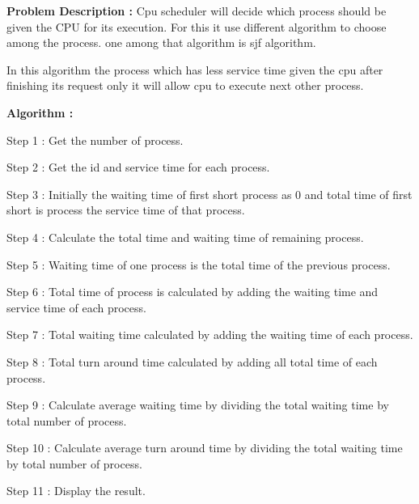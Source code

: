 \documentclass[journal,onecolumn]{IEEEtran}
\begin{document}
\textbf{Problem Description : }
Cpu scheduler will decide which process should be given the CPU for its execution. For this it use different algorithm to choose among the process. one among that algorithm is sjf algorithm.

In this algorithm the process which has less service time given the cpu after finishing its request only it will allow cpu to execute next other process.

\textbf{Algorithm : }
\begin{list}{}{}
  \item Step 1 : Get the number of process.
  \item Step 2 : Get the id and service time for each process.
  \item Step 3 : Initially the waiting time of first short process as 0 and total time of
        first short is process the service time of that process.
  \item Step 4 : Calculate the total time and waiting time of remaining process.
  \item Step 5 : Waiting time of one process is the total time of the previous process.
  \item Step 6 : Total time of process is calculated by adding the waiting time and
        service time of each process.
  \item Step 7 : Total waiting time calculated by adding the waiting time of each
        process.
  \item Step 8 : Total turn around time calculated by adding all total time of
        each process.
  \item Step 9 : Calculate average waiting time by dividing the total waiting time by
        total number of process.
  \item Step 10 : Calculate average turn around time by dividing the total waiting time
        by total number of process.
  \item Step 11 : Display the result.
\end{list}
\end{document}
